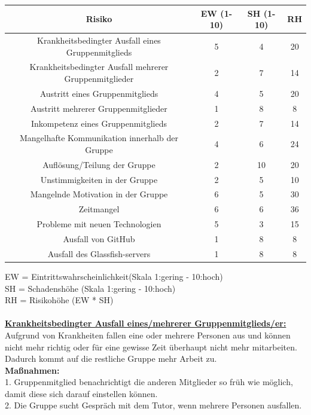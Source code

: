 \documentclass[fontsize=12pt,paper=a4,twoside]{scrartcl}
\begin{document}
\begin{center}
\begin{tabular}{|c|c|c|c|} \hline 
\textbf{Risiko} & \textbf{EW (1-10)} & \textbf{SH (1-10)} & \textbf{RH}\\ \hline \hline
Krankheitsbedingter Ausfall eines Gruppenmitglieds & 5  & 4 & 20\\ \hline
Krankheitsbedingter Ausfall mehrerer Gruppenmitglieder & 2  & 7 & 14\\ \hline
Austritt eines Gruppenmitglieds & 4 & 5 & 20\\ \hline
Austritt mehrerer Gruppenmitglieder & 1 & 8 & 8\\ \hline
Inkompetenz eines Gruppenmitglieds & 2 & 7 & 14\\ \hline
Mangelhafte Kommunikation innerhalb der Gruppe & 4 & 6 & 24\\ \hline
Auflösung/Teilung der Gruppe & 2 & 10 & 20\\ \hline
Unstimmigkeiten in der Gruppe & 2 & 5 & 10\\ \hline
Mangelnde Motivation in der Gruppe & 6 & 5 & 30\\ \hline
Zeitmangel & 6 & 6 & 36\\ \hline
Probleme mit neuen Technologien & 5 & 3 & 15\\ \hline
Ausfall von GitHub & 1 & 8 & 8\\ \hline
Ausfall des Glassfish-servers & 1 & 8 & 8\\ \hline
\end{tabular}
\end{center}
EW = Eintrittswahrscheinlichkeit(Skala 1:gering - 10:hoch)\\
SH = Schadenshöhe (Skala 1:gering - 10:hoch)\\
RH = Risikohöhe (EW * SH)\\
\bigskip \\
\textbf{\underline{Krankheitsbedingter Ausfall eines/mehrerer Gruppenmitglieds/er:}}\\
Aufgrund von Krankheiten fallen eine oder mehrere Personen aus und können nicht mehr richtig oder für eine gewisse Zeit überhaupt nicht mehr mitarbeiten. Dadurch kommt auf die restliche Gruppe mehr Arbeit zu.\\
\textbf{Maßnahmen:}\\
1. Gruppenmitglied benachrichtigt die anderen Mitglieder so früh wie möglich, damit diese sich darauf einstellen können.\\
2. Die Gruppe sucht Gespräch mit dem Tutor, wenn mehrere Personen ausfallen.\\
\end{document}
